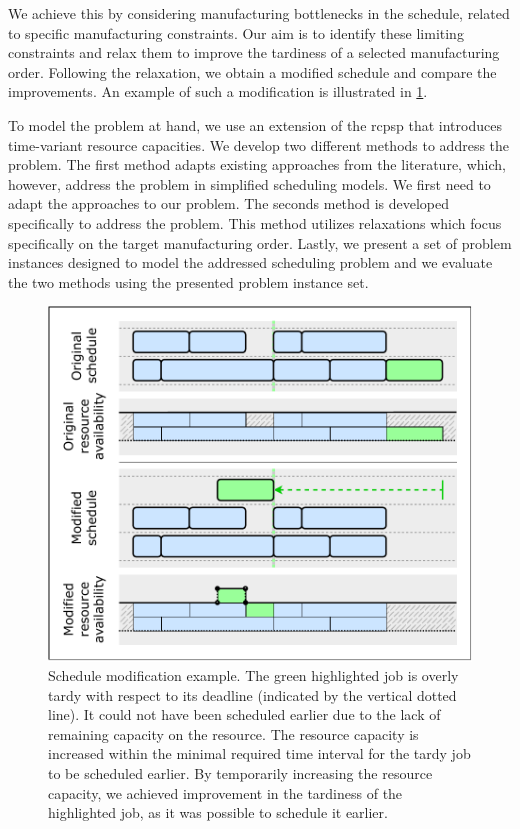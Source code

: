 We achieve this by considering manufacturing bottlenecks in the schedule,
related to specific manufacturing constraints.
Our aim is to identify these limiting constraints
and relax them to improve the tardiness of a selected manufacturing order.
Following the relaxation, we obtain a modified schedule and compare the improvements.
An example of such a modification is illustrated in \cref{fig:schedule-change}.

To model the problem at hand, we use an extension of the \acf{rcpsp}
that introduces time-variant resource capacities.
We develop two different methods to address the problem.
The first method adapts existing approaches from the literature,
which, however, address the problem in simplified scheduling models.
We first need to adapt the approaches to our problem.
The seconds method is developed specifically to address the problem.
This method utilizes relaxations which focus specifically on the target manufacturing order.
Lastly, we present a set of problem instances designed to model the addressed scheduling problem
and we evaluate the two methods using the presented problem instance set.

\begin{figure}[tb]
    \centering
    \includegraphics[width=\textwidth]{img/Schedule-Change.pdf}
    \caption{
        Schedule modification example.
        The green highlighted job is overly tardy with respect to its deadline (indicated by the vertical dotted line).
        It could not have been scheduled earlier due to the lack of remaining capacity on the resource.
        The resource capacity is increased within the minimal required time interval
        for the tardy job to be scheduled earlier.
        By temporarily increasing the resource capacity,
        we achieved improvement in the tardiness of the highlighted job,
        as it was possible to schedule it earlier.
        }
    \label{fig:schedule-change}
\end{figure}

